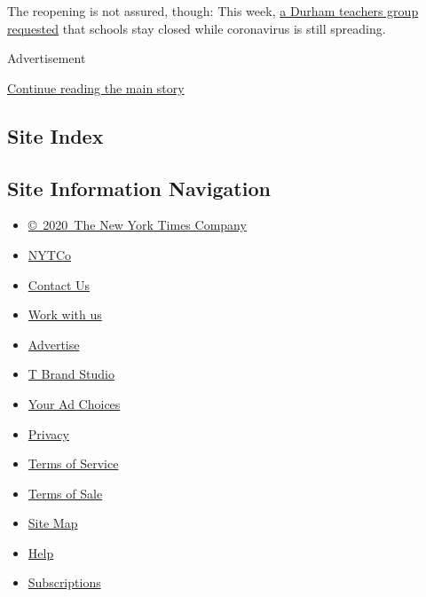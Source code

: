 The reopening is not assured, though: This week,
\href{https://daenc.com/2020/07/13/statement-on-school-re-open-plans/}{a
Durham teachers group requested} that schools stay closed while
coronavirus is still spreading.

Advertisement

\protect\hyperlink{after-bottom}{Continue reading the main story}

\hypertarget{site-index}{%
\subsection{Site Index}\label{site-index}}

\hypertarget{site-information-navigation}{%
\subsection{Site Information
Navigation}\label{site-information-navigation}}

\begin{itemize}
\tightlist
\item
  \href{https://help.nytimes.com/hc/en-us/articles/115014792127-Copyright-notice}{©~2020~The
  New York Times Company}
\end{itemize}

\begin{itemize}
\tightlist
\item
  \href{https://www.nytco.com/}{NYTCo}
\item
  \href{https://help.nytimes.com/hc/en-us/articles/115015385887-Contact-Us}{Contact
  Us}
\item
  \href{https://www.nytco.com/careers/}{Work with us}
\item
  \href{https://nytmediakit.com/}{Advertise}
\item
  \href{http://www.tbrandstudio.com/}{T Brand Studio}
\item
  \href{https://www.nytimes.com/privacy/cookie-policy\#how-do-i-manage-trackers}{Your
  Ad Choices}
\item
  \href{https://www.nytimes.com/privacy}{Privacy}
\item
  \href{https://help.nytimes.com/hc/en-us/articles/115014893428-Terms-of-service}{Terms
  of Service}
\item
  \href{https://help.nytimes.com/hc/en-us/articles/115014893968-Terms-of-sale}{Terms
  of Sale}
\item
  \href{https://spiderbites.nytimes.com}{Site Map}
\item
  \href{https://help.nytimes.com/hc/en-us}{Help}
\item
  \href{https://www.nytimes.com/subscription?campaignId=37WXW}{Subscriptions}
\end{itemize}
